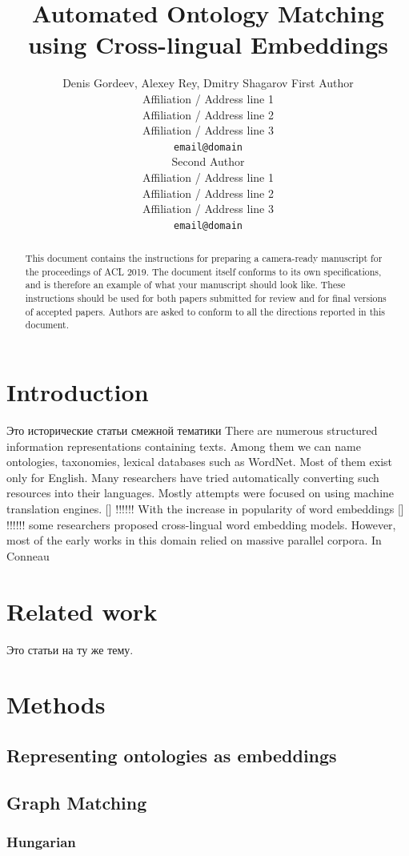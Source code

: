 \documentclass[11pt,a4paper]{article}
\title{Automated Ontology Matching using Cross-lingual Embeddings}
\author{Denis Gordeev, Alexey Rey, Dmitry Shagarov
	First Author \\
  Affiliation / Address line 1 \\
  Affiliation / Address line 2 \\
  Affiliation / Address line 3 \\
  \texttt{email@domain} \\\And
  Second Author \\
  Affiliation / Address line 1 \\
  Affiliation / Address line 2 \\
  Affiliation / Address line 3 \\
  \texttt{email@domain} \\}
\date{}
\begin{document}
\maketitle
\begin{abstract}
  This document contains the instructions for preparing a camera-ready
  manuscript for the proceedings of ACL 2019. The document itself
  conforms to its own specifications, and is therefore an example of
  what your manuscript should look like. These instructions should be
  used for both papers submitted for review and for final versions of
  accepted papers.  Authors are asked to conform to all the directions
  reported in this document.
\end{abstract}


\section{Introduction}
\foreignlanguage{russian}{Это исторические статьи смежной тематики}
There are numerous structured information representations containing texts. Among them we can name ontologies, taxonomies, lexical databases such as WordNet. Most of them exist only for English. Many researchers have tried automatically converting such resources into their languages. Mostly attempts were focused on using machine translation engines. [] !!!!!! With the increase in popularity of word embeddings [] !!!!!! some researchers proposed cross-lingual word embedding models. However, most of the early works in this domain relied on massive parallel corpora. In \citeyearpar{muse} Conneau 

\section{Related work}
\foreignlanguage{russian}{Это статьи на ту же тему.}
\section{Methods}
\subsection{Representing ontologies as embeddings}
\subsection{Graph Matching}
\subsubsection{Hungarian}
\end{document}
